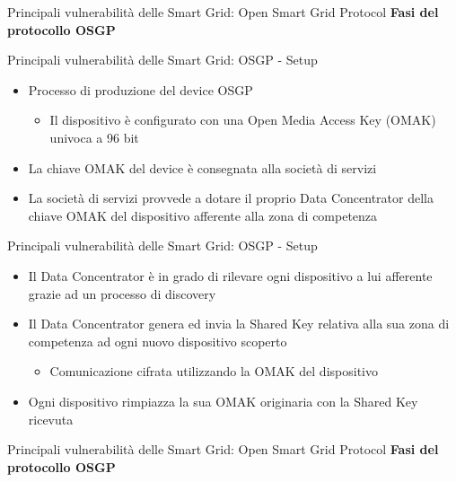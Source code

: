 \begin{frame}{Principali vulnerabilità delle Smart Grid: Open Smart Grid Protocol}
	\textbf{Fasi del protocollo OSGP}
\end{frame}

\begin{frame}{Principali vulnerabilità delle Smart Grid: OSGP - Setup}
	\begin{itemize}[<+- | alert@+>]
		\item Processo di produzione del device OSGP
		\begin{itemize}
			\item Il dispositivo è configurato con una Open Media Access Key (OMAK) univoca a 96 bit
		\end{itemize}
		\item La chiave OMAK del device è consegnata alla società di servizi
		\item La società di servizi provvede a dotare il proprio Data Concentrator della chiave OMAK del dispositivo afferente alla zona di competenza
	\end{itemize}
\end{frame}
\begin{frame}{Principali vulnerabilità delle Smart Grid: OSGP - Setup}
	\begin{itemize}[<+- | alert@+>]
		\item Il Data Concentrator è in grado di rilevare ogni dispositivo a lui afferente grazie ad un processo di discovery
		\item Il Data Concentrator genera ed invia la Shared Key relativa alla sua zona di competenza ad ogni nuovo dispositivo scoperto
		\begin{itemize}
			\item Comunicazione cifrata utilizzando la OMAK del dispositivo
		\end{itemize}
		\item Ogni dispositivo rimpiazza la sua OMAK originaria con la Shared Key ricevuta
	\end{itemize}
\end{frame}
\begin{frame}{Principali vulnerabilità delle Smart Grid: Open Smart Grid Protocol}
	\textbf{Fasi del protocollo OSGP}
\end{frame}


